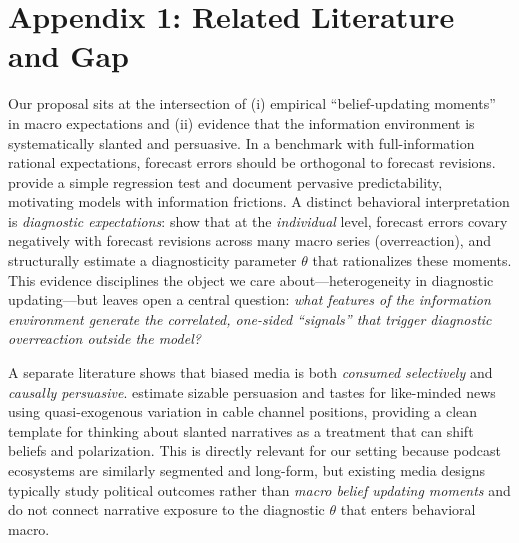 \documentclass[12pt]{article}
\begin{document}
\vfill
\pagebreak



\vfill
\pagebreak

\section*{Appendix 1: Related Literature and Gap}
Our proposal sits at the intersection of (i) empirical ``belief-updating moments'' in macro expectations and (ii) evidence that the information environment is systematically slanted and persuasive. In a benchmark with full-information rational expectations, forecast errors should be orthogonal to forecast revisions. \citet{CoibionGorodnichenko2015} provide a simple regression test and document pervasive predictability, motivating models with information frictions. A distinct behavioral interpretation is \emph{diagnostic expectations}: \citet{BordaloGennaioliMaShleifer2020} show that at the \emph{individual} level, forecast errors covary negatively with forecast revisions across many macro series (overreaction), and structurally estimate a diagnosticity parameter $\theta$ that rationalizes these moments. This evidence disciplines the object we care about---heterogeneity in diagnostic updating---but leaves open a central question: \emph{what features of the information environment generate the correlated, one-sided ``signals'' that trigger diagnostic overreaction outside the model?}

A separate literature shows that biased media is both \emph{consumed selectively} and \emph{causally persuasive}. \citet{MartinYurukoglu2017} estimate sizable persuasion and tastes for like-minded news using quasi-exogenous variation in cable channel positions, providing a clean template for thinking about slanted narratives as a treatment that can shift beliefs and polarization. This is directly relevant for our setting because podcast ecosystems are similarly segmented and long-form, but existing media designs typically study political outcomes rather than \emph{macro belief updating moments} and do not connect narrative exposure to the diagnostic $\theta$ that enters behavioral macro.
\end{document}
